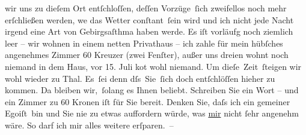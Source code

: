                wir uns zu dieſem Ort entſchloſſen, deſſen Vorzüge ſich zweifellos noch mehr
               erſchließen werden, we{\geminationn} das Wetter conſtant ſein wird
               und ich nicht jede Nacht irgend eine Art von Ge{\pb}birgsaſthma haben werde. Es iſt
               vorläufg noch ziemlich leer – wir wohnen in einem netten Privathaus – ich zahle für mein hübſches
               angenehmes Zimmer 60 Kreuzer (zwei Fenſter), \strikeout{\textcolor{gray}{X}} außer uns dreien wohnt noch niemand in dem Haus, vor 15. Juli ko{\geminationm}t wohl niemand. Um dieſe Zeit ſteigen wir wohl wieder
               zu Thal. Es ſei denn dſs Sie ſich doch entſchlöſſen hieher zu kommen. Da{\geminationn} bleiben wir, ſolang es Ihnen beliebt. Schreiben Sie
               ein Wort – und ein Zimmer zu 60 Kronen iſt für Sie bereit. Denken Sie, daſs ich ein
               gemeiner Egoiſt bin und Sie nie zu etwas auffordern würde, was \uline{mir}{ }{\pb}nicht{ }ſehr angenehm wäre. So darf ich
               mir alles weitere erſparen. –\pend
           
